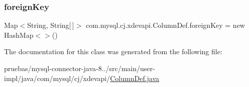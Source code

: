 \subsubsection{\texorpdfstring{foreign\+Key}{foreignKey}}
{\footnotesize\ttfamily Map$<$String, String\mbox{[}$\,$\mbox{]}$>$ com.\+mysql.\+cj.\+xdevapi.\+Column\+Def.\+foreign\+Key = new Hash\+Map$<$$>$()\hspace{0.3cm}{\ttfamily [protected]}}



The documentation for this class was generated from the following file\+:\begin{DoxyCompactItemize}
\item 
pruebas/mysql-\/connector-\/java-\/8../src/main/user-\/impl/java/com/mysql/cj/xdevapi/\mbox{\hyperlink{_column_def_8java}{Column\+Def.\+java}}\end{DoxyCompactItemize}

